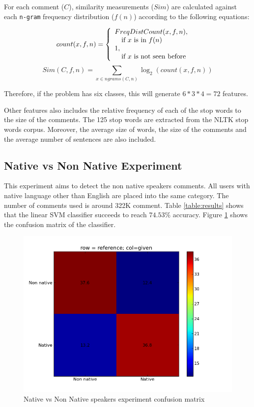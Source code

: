 \documentclass[10pt,a5paper,twoside]{article}
\begin{document}
For each comment ($C$), similarity measurements ($Sim$) are calculated against each \verb+n-gram+ frequency distribution ($f(n)$) according to the following equations:

\[
  count(x, f, n) = \left\{ 
  \begin{array}{l l}
    FreqDistCount(x, f, n), & \\\quad \text{if $x$ is in $f(n)$}\\
    1,&\\\quad \text{if $x$ is not seen before}\\
  \end{array} \right.
\]
\[
  Sim(C,f,n) = \sum_{x \in ngrams(C,n)} \log_2 (count(x,f,n))
\]

Therefore, if the problem has six classes, this will generate $6*3*4 = 72$ features.

Other features also includes the relative frequency of each of the stop words to
the size of the comments. The 125 stop words are extracted from the NLTK stop
words corpus\cite{nltk}. Moreover, the average size of words, the size of the comments and the average number of sentences are also included.


\subsection{Native vs Non Native Experiment}
This experiment aims to detect the non native speakers comments. All users with native language other than English are placed into the same category. The number of comments used is around 322K comment. Table \ref{table:results} shows that the linear SVM classifier succeeds to reach $74.53\%$ accuracy. Figure \ref{non_cfm} shows the confusion matrix of the classifier.


\begin{figure}
\centering
\includegraphics[scale=0.35]{native_cfm.png}
\caption{Native vs Non Native speakers experiment confusion matrix}
\label{non_cfm}
\end{figure}
\end{document}
